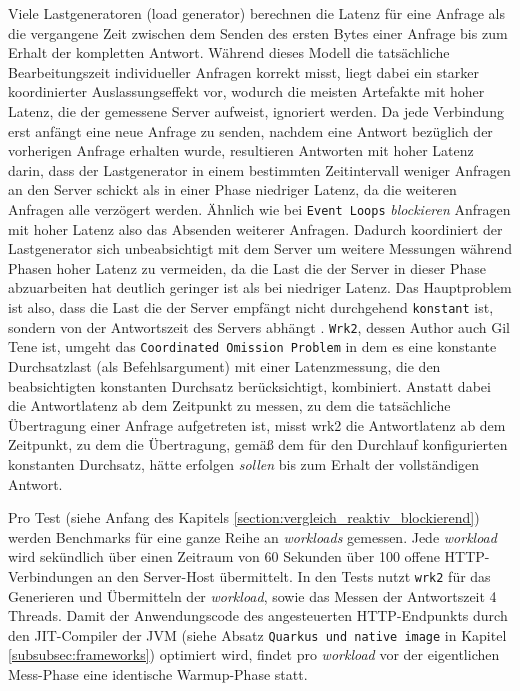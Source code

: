 Viele Lastgeneratoren (load generator) berechnen die Latenz für eine Anfrage als die vergangene Zeit zwischen dem Senden des ersten Bytes einer Anfrage
bis zum Erhalt der kompletten Antwort. Während dieses Modell die tatsächliche Bearbeitungszeit individueller Anfragen korrekt misst,
liegt dabei ein starker koordinierter Auslassungseffekt vor,
wodurch die meisten Artefakte mit hoher Latenz, die der gemessene Server aufweist, ignoriert werden.
Da jede Verbindung erst anfängt eine neue Anfrage zu senden, nachdem eine Antwort bezüglich der vorherigen Anfrage erhalten wurde,
resultieren Antworten mit hoher Latenz darin, dass der Lastgenerator in einem bestimmten Zeitintervall weniger Anfragen an den Server schickt als in einer
Phase niedriger Latenz, da die weiteren Anfragen alle verzögert werden. Ähnlich wie bei \verb|Event Loops| \textit{blockieren}
Anfragen mit hoher Latenz also das Absenden weiterer Anfragen.
Dadurch koordiniert der Lastgenerator sich unbeabsichtigt mit dem Server um weitere Messungen während Phasen hoher Latenz zu vermeiden, da die Last die der Server
in dieser Phase abzuarbeiten hat deutlich geringer ist als bei niedriger Latenz. Das Hauptproblem ist also, dass die Last die der Server empfängt
nicht durchgehend \verb|konstant| ist, sondern von der Antwortszeit des Servers abhängt \parencite{mci/Friedrich2017}.
\newline\newline
\verb|Wrk2|, dessen Author auch Gil Tene ist, umgeht das \verb|Coordinated Omission Problem| in dem es eine konstante Durchsatzlast (als Befehlsargument) mit
einer Latenzmessung, die den beabsichtigten konstanten Durchsatz berücksichtigt, kombiniert. Anstatt dabei die Antwortlatenz ab dem Zeitpunkt zu messen,
zu dem die tatsächliche Übertragung einer Anfrage aufgetreten ist, misst wrk2 die Antwortlatenz ab dem Zeitpunkt, zu dem die Übertragung,
gemäß dem für den Durchlauf konfigurierten konstanten Durchsatz, hätte erfolgen \textit{sollen} bis zum Erhalt der vollständigen Antwort\parencite{Wrk2}.

Pro Test (siehe Anfang des Kapitels \ref{section:vergleich_reaktiv_blockierend}) werden Benchmarks für eine ganze Reihe an \textit{workloads} gemessen.
Jede \textit{workload} wird sekündlich über einen Zeitraum von 60 Sekunden über 100 offene HTTP-Verbindungen an den Server-Host übermittelt.
In den Tests nutzt \verb|wrk2| für das Generieren und Übermitteln der \textit{workload}, sowie das Messen der Antwortszeit
4 Threads.
\newline\newline
Damit der Anwendungscode des angesteuerten HTTP-Endpunkts durch den JIT-Compiler der JVM (siehe Absatz \verb|Quarkus und native image| in Kapitel
\ref{subsubsec:frameworks}) optimiert wird, findet pro \textit{workload} vor der eigentlichen Mess-Phase eine identische Warmup-Phase statt.

